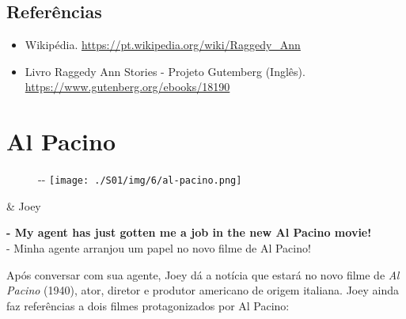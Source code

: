 \hypertarget{referuxeancias-2}{%
\subsection{Referências}\label{referuxeancias-2}}

\begin{itemize}
\tightlist
\item
  \sloppy Wikipédia. \url{https://pt.wikipedia.org/wiki/Raggedy_Ann}
\item
  \sloppy Livro Raggedy Ann Stories - Projeto Gutemberg (Inglês). \url{https://www.gutenberg.org/ebooks/18190}
\end{itemize}

\hypertarget{al-pacino}{%
\section{Al Pacino}\label{al-pacino}}

\begin{figure}[!ht]
  \begin{adjustwidth}{-\oddsidemargin-1in}{-\rightmargin}
    \centering
    \texttt{[image: ./S01/img/6/al-pacino.png]}
  \end{adjustwidth}
\end{figure}

\begin{tcolorbox}[enhanced,center upper,
    drop fuzzy shadow southeast, boxrule=0.3pt,
    lower separated=false,
    colframe=black!30!dialogoBorder,colback=white]
\begin{minipage}[c]{0.16\linewidth}
   & \centering \scriptsize{Joey}
\end{minipage}
\hfill
\begin{minipage}[c]{0.8\linewidth}
  \textbf{- My agent has just gotten me a job in the new Al Pacino movie!}\\
  - Minha agente arranjou um papel no novo filme de Al Pacino!
\end{minipage}
\end{tcolorbox}

Após conversar com sua agente, Joey dá a notícia que estará no novo
filme de \emph{Al Pacino} (1940), ator, diretor e produtor americano de
origem italiana. Joey ainda faz referências a dois filmes protagonizados
por Al Pacino:

